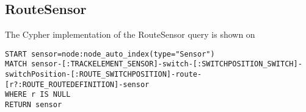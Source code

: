 \subsection{RouteSensor}

The Cypher implementation of the RouteSensor query is shown on %

\begin{lstlisting}[caption=Cyper query for the RouteSensor test case, label=lst:cypher-routesensor, breaklines=true]
START sensor=node:node_auto_index(type="Sensor")
MATCH sensor-[:TRACKELEMENT_SENSOR]-switch-[:SWITCHPOSITION_SWITCH]-switchPosition-[:ROUTE_SWITCHPOSITION]-route-[r?:ROUTE_ROUTEDEFINITION]-sensor
WHERE r IS NULL
RETURN sensor
\end{lstlisting}
